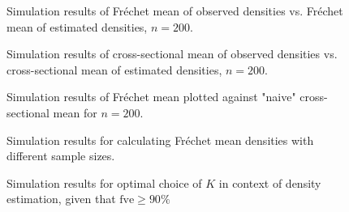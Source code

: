 \begin{figure}[h]
    \centering
    
    \caption[Simulation results: observed vs estimated densities --- Fréchet mean]{Simulation
    results of Fréchet mean of observed densities vs. Fréchet mean of estimated densities,
    $n=200$.}
    \label{fig:sim_f_denstimation}
\end{figure}

\begin{figure}[h]
    \centering
    \resizebox{0.9\textwidth}{!}{}
    \caption[Simulation results: observed vs estimated densities --- cross-sectional mean]{Simulation
    results of cross-sectional mean of observed densities vs. cross-sectional mean of
    estimated densities, $n=200$.}
    \label{fig:sim_cs_denstimation}
\end{figure}

\begin{figure}[h]
    \centering
    \resizebox{0.9\textwidth}{!}{}
    \caption[Simulation results: Fréchet mean vs cross-sectional mean]{Simulation
    results of Fréchet mean plotted against "naive" cross-sectional mean for $n = 200$.}
    \label{fig:sim_f_vs_cs}
\end{figure}

\begin{figure}[h]
    \centering
    \resizebox{0.9\textwidth}{!}{}
    \caption[Simulation results: average Fréchet means]{Simulation results for calculating
    Fréchet mean densities with different sample sizes.}
    \label{fig:sim_f_mean}
\end{figure}

\begin{figure}[h]
    \centering
    \resizebox{0.9\textwidth}{!}{}
    \caption[Simulation results: optimal $K$]{Simulation results for optimal choice of
    $K$ in context of density estimation, given that $\text{fve} \geq 90 \%$}
    \label{fig:sim_k_opt_denstimation}
\end{figure}

